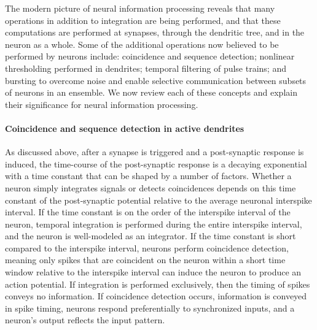 \documentclass[twocolumn]{article}
\begin{document}
The modern picture of neural information processing reveals that many operations in addition to integration are being performed, and that these computations are performed at synapses, through the dendritic tree, and in the neuron as a whole. Some of the additional operations now believed to be performed by neurons include: coincidence and sequence detection; nonlinear thresholding performed in dendrites; temporal filtering of pulse trains; and bursting to overcome noise and enable selective communication between subsets of neurons in an ensemble. We now review each of these concepts and explain their significance for neural information processing.

\paragraph{Coincidence and sequence detection in active dendrites}
As discussed above, after a synapse is triggered and a post-synaptic response is induced, the time-course of the post-synaptic response is a decaying exponential with a time constant that can be shaped by a number of factors. Whether a neuron simply integrates signals or detects coincidences depends on this time constant of the post-synaptic potential relative to the average neuronal interspike interval. If the time constant is on the order of the interspike interval of the neuron, temporal integration is performed during the entire interspike interval, and the neuron is well-modeled as an integrator. If the time constant is short compared to the interspike interval, neurons perform coincidence detection, meaning only spikes that are coincident on the neuron within a short time window relative to the interspike interval can induce the neuron to produce an action potential. If integration is performed exclusively, then the timing of spikes conveys no information. If coincidence detection occurs, information is conveyed in spike timing, neurons respond preferentially to synchronized inputs, and a neuron's output reflects the input pattern.
\end{document}
